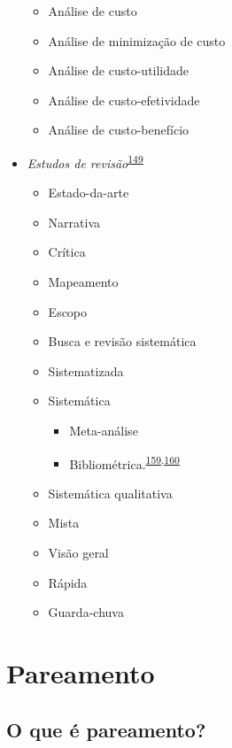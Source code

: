 \documentclass[
  a4paper,
]{book}
\begin{document}
\begin{itemize}
  \begin{itemize}
  \item
    Análise de custo
  \item
    Análise de minimização de custo
  \item
    Análise de custo-utilidade
  \item
    Análise de custo-efetividade
  \item
    Análise de custo-benefício
  \end{itemize}
\item
  \emph{Estudos de revisão}\textsuperscript{\protect\hyperlink{ref-Grant2009}{149}}

  \begin{itemize}
  \item
    Estado-da-arte
  \item
    Narrativa
  \item
    Crítica
  \item
    Mapeamento
  \item
    Escopo
  \item
    Busca e revisão sistemática
  \item
    Sistematizada
  \item
    Sistemática

    \begin{itemize}
    \item
      Meta-análise
    \item
      Bibliométrica.\textsuperscript{\protect\hyperlink{ref-donthu2021}{159},\protect\hyperlink{ref-lim2023}{160}}
    \end{itemize}
  \item
    Sistemática qualitativa
  \item
    Mista
  \item
    Visão geral
  \item
    Rápida
  \item
    Guarda-chuva
  \end{itemize}
\end{itemize}

\hypertarget{pareamento}{%
\section{Pareamento}\label{pareamento}}

\hypertarget{o-que-uxe9-pareamento}{%
\subsection{O que é pareamento?}\label{o-que-uxe9-pareamento}}
\end{document}
